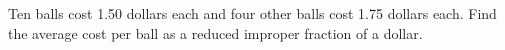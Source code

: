 Ten balls cost 1.50 dollars each and four other balls cost 1.75 dollars each. Find the average cost per ball as a reduced improper fraction of a dollar.
